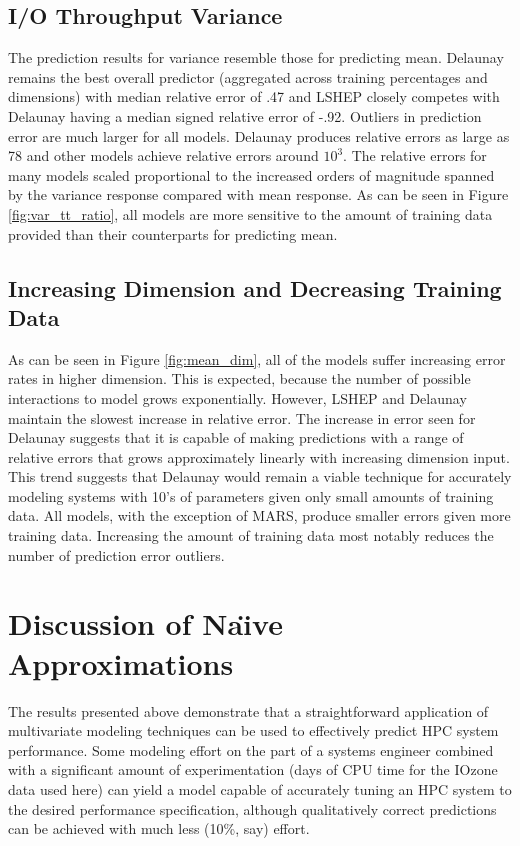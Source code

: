 \subsection{I/O Throughput Variance}

The prediction results for variance resemble those for
predicting mean. Delaunay remains the best overall predictor
(aggregated across training percentages and dimensions) with median
relative error of .47 and LSHEP closely competes with Delaunay having
a median signed relative error of -.92. Outliers in prediction error
are much larger for all models. Delaunay produces relative errors as
large as 78 and other models achieve relative errors around
$10^3$. The relative errors for many models scaled proportional to the
increased orders of magnitude spanned by the variance response
compared with mean response. As can be seen in Figure
\ref{fig:var_tt_ratio}, all models are more sensitive to the amount of
training data provided than their counterparts for predicting mean.

\subsection{Increasing Dimension and Decreasing Training Data}

As can be seen in Figure \ref{fig:mean_dim}, all of the models suffer
increasing error rates in higher dimension. This is expected, because
the number of possible interactions to model grows
exponentially. However, LSHEP and Delaunay maintain the slowest
increase in relative error. The increase in error seen for Delaunay
suggests that it is capable of making predictions with a range of
relative errors that grows approximately linearly with increasing
dimension input. This trend suggests that Delaunay would remain a
viable technique for accurately modeling systems with 10's of
parameters given only small amounts of training data. All models, with
the exception of MARS, produce smaller errors given more training
data. Increasing the amount of training data most notably reduces the
number of prediction error outliers.

\section{Discussion of Na\"{\i}ve Approximations}

The results presented above demonstrate that a straightforward
application of multivariate modeling techniques can be used to
effectively predict HPC system performance. Some modeling effort on
the part of a systems engineer combined with a significant amount of
experimentation (days of CPU time for the IOzone data used here) can
yield a model capable of accurately tuning an HPC system to the
desired performance specification, although qualitatively correct
predictions can be achieved with much less (10\%, say) effort.

